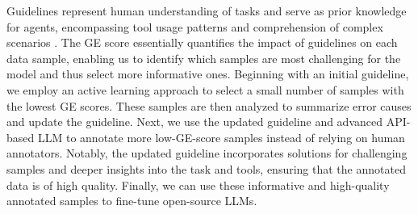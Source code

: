Guidelines represent human understanding of tasks and serve as prior knowledge for agents, encompassing tool usage patterns and comprehension of complex scenarios \cite{Zhao-Andrew-AAAI-2024-ExpeL,Fu-Yao-NeurIPS-2024-AutoGuide}. The GE score essentially quantifies the impact of guidelines on each data sample, enabling us to identify which samples are most challenging for the model and thus select more informative ones.
Beginning with an initial guideline, we employ an active learning approach to select a small number of samples with the lowest GE scores. These samples are then analyzed to summarize error causes and update the guideline. Next, we use the updated guideline and advanced API-based LLM to annotate more low-GE-score samples instead of relying on human annotators. Notably, the updated guideline incorporates solutions for challenging samples and deeper insights into the task and tools, ensuring that the annotated data is of high quality. Finally, we can use these informative and high-quality annotated samples to fine-tune open-source LLMs. 



